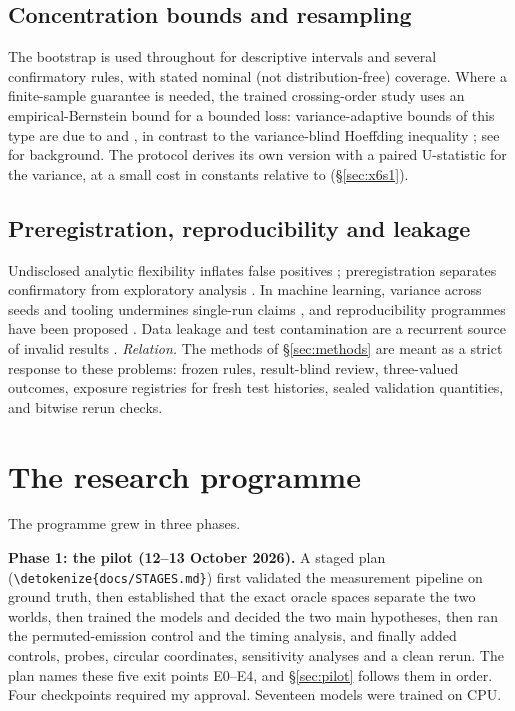 \documentclass[11pt,a4paper]{article}
\DeclareRobustCommand{\_}{\ifmmode\origunderscore\else\textunderscore\allowbreak\fi}
\DeclareRobustCommand{\fpath}[1]{\begingroup\small\expandafter\nolinkurl\expandafter{\detokenize{#1}}\endgroup}
\begin{document}
\subsection{Concentration bounds and resampling}
The bootstrap \citep{efron1979bootstrap} is used throughout for descriptive intervals and
several confirmatory rules, with stated nominal (not distribution-free) coverage. Where a
finite-sample guarantee is needed, the trained crossing-order study uses an empirical-Bernstein bound for a bounded
loss: variance-adaptive bounds of this type are due to \citet{audibert2009exploration} and
\citet{maurer2009empirical}, in contrast to the variance-blind Hoeffding inequality
\citep{hoeffding1963probability}; see \citet{boucheron2013concentration} for background. The
protocol derives its own version with a paired U-statistic for the variance, at a small cost
in constants relative to \citet{maurer2009empirical} (\S\ref{sec:x6s1}).

\subsection{Preregistration, reproducibility and leakage}
Undisclosed analytic flexibility inflates false positives \citep{simmons2011false};
preregistration separates confirmatory from exploratory analysis
\citep{nosek2018preregistration,munafo2017manifesto}. In machine learning, variance across seeds
and tooling undermines single-run claims \citep{henderson2018matters,bouthillier2021variance,zhuang2021randomness},
and reproducibility programmes have been proposed \citep{pineau2021reproducibility}. Data leakage
and test contamination are a recurrent source of invalid results
\citep{kaufman2012leakage,kapoor2023leakage,magar2022contamination,sainz2023contamination}.
\emph{Relation.} The methods of \S\ref{sec:methods} are meant as a strict response to these
problems: frozen rules, result-blind review, three-valued outcomes, exposure registries for fresh test
histories, sealed validation quantities, and bitwise rerun checks.

\section{The research programme}\label{sec:programme}

The programme grew in three phases.

\textbf{Phase 1: the pilot (12--13 October 2026).} A staged plan (\fpath{docs/STAGES.md}) first
validated the measurement pipeline on ground truth, then established that the exact oracle
spaces separate the two worlds, then trained the models and decided the two main hypotheses,
then ran the permuted-emission control and the timing analysis, and finally added controls,
probes, circular coordinates, sensitivity analyses and a clean rerun. The plan names these
five exit points E0--E4, and \S\ref{sec:pilot} follows them in order. Four checkpoints required
my approval. Seventeen models were trained on CPU.
\end{document}
